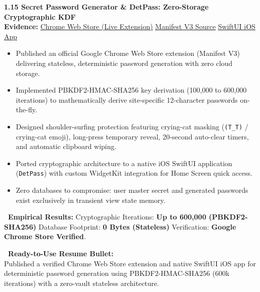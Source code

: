 \documentclass[10pt,a4paper]{article}
\newcommand{\statuscompleted}{\tcbox[on line, colback=completedbg, colframe=completed!50!white, size=small, arc=2pt, boxrule=0.5pt]{\scriptsize\bfseries\color{completed}\faIcon{check-circle}\ COMPLETED / SUBSTANTIAL}}
\begin{document}
\newpage

\begin{projectcard}
  \textbf{\large 1.15 Secret Password Generator \& DetPass: Zero-Storage Cryptographic KDF} \hfill \statuscompleted\\[2pt]
  {\footnotesize\color{textmuted}\textbf{Evidence:} \href{https://chromewebstore.google.com/detail/secret-password-generator/mfgnlfigpdcgfmndaljciagcgjiicnal}{\underline{Chrome Web Store (Live Extension)}} \quad\textbar\quad \underline{Manifest V3 Source} \quad\textbar\quad \underline{SwiftUI iOS App}}
  \begin{itemize}[leftmargin=14pt, itemsep=1.5pt, topsep=2pt]
    \item Published an official Google Chrome Web Store extension (Manifest V3) delivering stateless, deterministic password generation with zero cloud storage.
    \item Implemented PBKDF2-HMAC-SHA256 key derivation (100,000 to 600,000 iterations) to mathematically derive site-specific 12-character passwords on-the-fly.
    \item Designed shoulder-surfing protection featuring crying-cat masking (\texttt{(T\_T)} / crying-cat emoji), long-press temporary reveal, 20-second auto-clear timers, and automatic clipboard wiping.
    \item Ported cryptographic architecture to a native iOS SwiftUI application (\texttt{DetPass}) with custom WidgetKit integration for Home Screen quick access.
    \item Zero databases to compromise: user master secret and generated passwords exist exclusively in transient view state memory.
  \end{itemize}
  \begin{metricsbox}
    \textbf{\ Empirical Results:} Cryptographic Iterations: \textbf{Up to 600,000 (PBKDF2-SHA256)} \quad\textbar\quad Database Footprint: \textbf{0 Bytes (Stateless)} \quad\textbar\quad Verification: \textbf{Google Chrome Store Verified}.
  \end{metricsbox}
  \begin{resumebox}
    \textbf{\color{accent}\ Ready-to-Use Resume Bullet:}\\
    Published a verified Chrome Web Store extension and native SwiftUI iOS app for deterministic password generation using PBKDF2-HMAC-SHA256 (600k iterations) with a zero-vault stateless architecture.
  \end{resumebox}
\end{projectcard}
\end{document}
